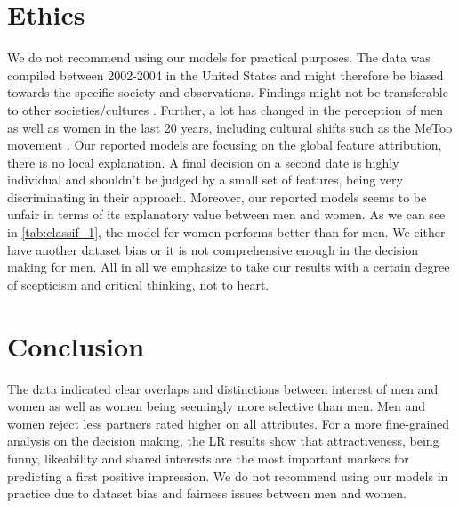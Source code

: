 \documentclass{article}
\begin{document}
\section{Ethics} \label{sec:ethics}
We do not recommend using our models for practical purposes. The data was compiled between 2002-2004 in the United States and might therefore be biased towards the specific society and observations. Findings might not be transferable to other societies/cultures \cite{shiota2010love}. Further, a lot has changed in the perception of men as well as women in the last 20 years, including cultural shifts such as the MeToo movement \cite{hillstrom2018metoo}. 
Our reported models are focusing on the global feature attribution, there is no local explanation. A final decision on a second date is highly individual and shouldn't be judged by a small set of features, being very discriminating in their approach. 
Moreover, our reported models seems to be unfair in terms of its explanatory value between men and women. As we can see in \autoref{tab:classif_1}, the model for women performs better than for men. We either have another dataset bias or it is not comprehensive enough in the decision making for men. 
All in all we emphasize to take our results with a certain degree of scepticism and critical thinking, not to heart. 

\section{Conclusion}
The data indicated clear overlaps and distinctions between interest of men and women as well as women being seemingly more selective than men. Men and women reject less partners rated higher on all attributes. 
For a more fine-grained analysis on the decision making, the LR results show that attractiveness, being funny, likeability and shared interests are the most important markers for predicting a first positive impression.  
We do not recommend using our models in practice due to dataset bias and fairness issues between men and women.




\end{document}
